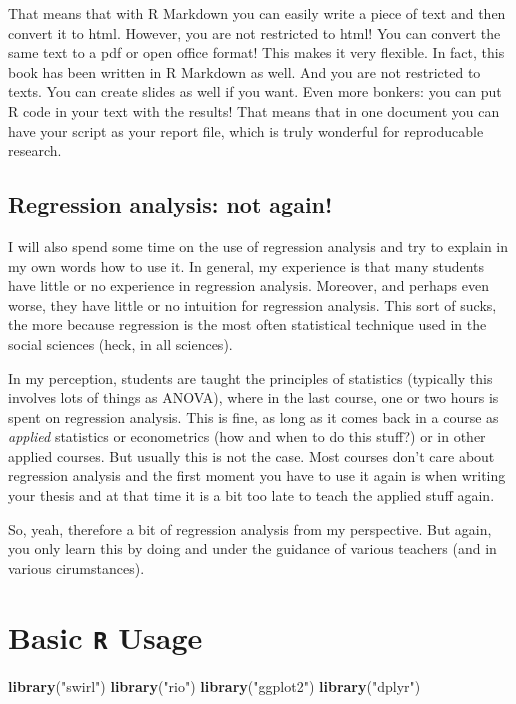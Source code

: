 \documentclass[]{article}
\newenvironment{Shaded}{\begin{snugshade}}{\end{snugshade}}
\newcommand{\KeywordTok}[1]{\textcolor[rgb]{0.13,0.29,0.53}{\textbf{{#1}}}}
\newcommand{\StringTok}[1]{\textcolor[rgb]{0.31,0.60,0.02}{{#1}}}
\newcommand{\NormalTok}[1]{{#1}}
\theoremstyle{definition}
\theoremstyle{definition}
\theoremstyle{definition}
\theoremstyle{remark}
\begin{document}
That means that with R Markdown you can easily write a piece of text and
then convert it to html. However, you are not restricted to html! You
can convert the same text to a pdf or open office format! This makes it
very flexible. In fact, this book has been written in R Markdown as
well. And you are not restricted to texts. You can create slides as well
if you want. Even more bonkers: you can put R code in your text with the
results! That means that in one document you can have your script as
your report file, which is truly wonderful for reproducable research.

\subsection{Regression analysis: not
again!}\label{regression-analysis-not-again}

I will also spend some time on the use of regression analysis and try to
explain in my own words how to use it. In general, my experience is that
many students have little or no experience in regression analysis.
Moreover, and perhaps even worse, they have little or no intuition for
regression analysis. This sort of sucks, the more because regression is
the most often statistical technique used in the social sciences (heck,
in all sciences).

In my perception, students are taught the principles of statistics
(typically this involves lots of things as ANOVA), where in the last
course, one or two hours is spent on regression analysis. This is fine,
as long as it comes back in a course as \emph{applied} statistics or
econometrics (how and when to do this stuff?) or in other applied
courses. But usually this is not the case. Most courses don't care about
regression analysis and the first moment you have to use it again is
when writing your thesis and at that time it is a bit too late to teach
the applied stuff again.

So, yeah, therefore a bit of regression analysis from my perspective.
But again, you only learn this by doing and under the guidance of
various teachers (and in various cirumstances).

\section{\texorpdfstring{Basic \texttt{R}
Usage}{Basic R Usage}}\label{basic-r-usage}

\begin{Shaded}
\begin{Highlighting}[]
\KeywordTok{library}\NormalTok{(}\StringTok{"swirl"}\NormalTok{)}
\KeywordTok{library}\NormalTok{(}\StringTok{"rio"}\NormalTok{)}
\KeywordTok{library}\NormalTok{(}\StringTok{"ggplot2"}\NormalTok{)}
\KeywordTok{library}\NormalTok{(}\StringTok{"dplyr"}\NormalTok{)}
\end{Highlighting}
\end{Shaded}
\end{document}
